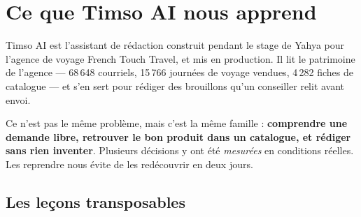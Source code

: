 \chapter{Ce que Timso AI nous apprend}
\label{ch:timso}

Timso AI est l'assistant de rédaction construit pendant le stage de Yahya pour l'agence de voyage
French Touch Travel, et mis en production. Il lit le patrimoine de l'agence --- 68\,648 courriels,
15\,766 journées de voyage vendues, 4\,282 fiches de catalogue --- et s'en sert pour rédiger des
brouillons qu'un conseiller relit avant envoi.

Ce n'est pas le même problème, mais c'est la même famille : \textbf{comprendre une demande libre,
retrouver le bon produit dans un catalogue, et rédiger sans rien inventer}. Plusieurs décisions y
ont été \emph{mesurées} en conditions réelles. Les reprendre nous évite de les redécouvrir en deux
jours.

\section{Les leçons transposables}

